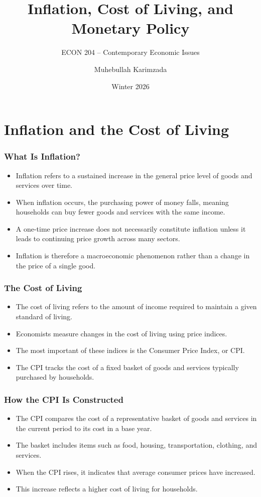 \documentclass[aspectratio=169]{beamer}
\title{\textbf{Inflation, Cost of Living, and Monetary Policy}}
\subtitle{ECON 204 -- Contemporary Economic Issues}
\author{Muhebullah Karimzada}
\date{Winter 2026}
\begin{document}
\begin{frame}
\transfade
\titlepage
\end{frame}

\section{Inflation and the Cost of Living}

\begin{frame}
\transfade
\frametitle{What Is Inflation?}
\begin{itemize}
\item Inflation refers to a sustained increase in the general price level of goods and services over time.
\item When inflation occurs, the purchasing power of money falls, meaning households can buy fewer goods and services with the same income.
\item A one-time price increase does not necessarily constitute inflation unless it leads to continuing price growth across many sectors.
\item Inflation is therefore a macroeconomic phenomenon rather than a change in the price of a single good.
\end{itemize}
\end{frame}

\begin{frame}
\transfade
\frametitle{The Cost of Living}
\begin{itemize}
\item The cost of living refers to the amount of income required to maintain a given standard of living.
\item Economists measure changes in the cost of living using price indices.
\item The most important of these indices is the Consumer Price Index, or CPI.
\item The CPI tracks the cost of a fixed basket of goods and services typically purchased by households.
\end{itemize}
\end{frame}

\begin{frame}
\transfade
\frametitle{How the CPI Is Constructed}
\begin{itemize}
\item The CPI compares the cost of a representative basket of goods and services in the current period to its cost in a base year.
\item The basket includes items such as food, housing, transportation, clothing, and services.
\item When the CPI rises, it indicates that average consumer prices have increased.
\item This increase reflects a higher cost of living for households.
\end{itemize}
\end{frame}
\end{document}
